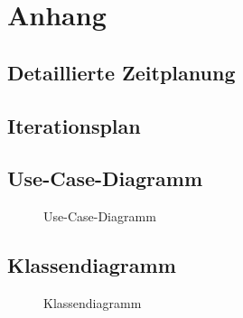 \section{Anhang}
\subsection{Detaillierte Zeitplanung}
\label{app:Zeitplanung}



\clearpage


\clearpage

\subsection{Iterationsplan}
\label{app:Iterationsplan}


\clearpage

\subsection{Use-Case-Diagramm}
\label{app:UseCase}
\begin{figure}[htb]
\centering
{}
\caption{Use-Case-Diagramm}
\end{figure}


\clearpage


\clearpage


\clearpage

\clearpage

\subsection{Klassendiagramm}
\label{app:Klassendiagramm}
\begin{figure}[htb]
\centering
{}
\caption{Klassendiagramm}
\end{figure}
\clearpage
